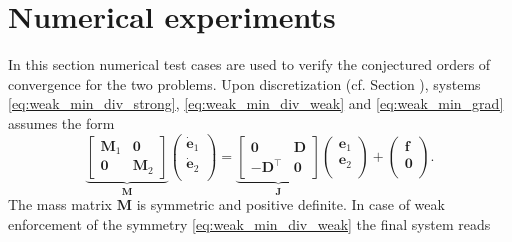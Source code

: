 \section{Numerical experiments}
\label{sec:numerics_mixed}
In this section numerical test cases are used to verify the conjectured orders of convergence for the two problems. Upon discretization (cf. Section ), systems \eqref{eq:weak_min_div_strong}, \eqref{eq:weak_min_div_weak} and \eqref{eq:weak_min_grad} assumes the form 
\begin{equation*}
\underbrace{
	\begin{bmatrix}
	\mathbf{M}_1 & \mathbf{0} \\
	\mathbf{0} & \mathbf{M}_2
	\end{bmatrix}}_{\mathbf{M}}
\begin{pmatrix}
\dot{\mathbf{e}}_1 \\
\dot{\mathbf{e}}_2 \\
\end{pmatrix} = 
\underbrace{
	\begin{bmatrix}
	\mathbf{0} & \mathbf{D} \\
	-\mathbf{D}^\top & \mathbf{0}
	\end{bmatrix}}_{\mathbf{J}}
\begin{pmatrix}
{\mathbf{e}}_1 \\
{\mathbf{e}}_2 \\
\end{pmatrix} + 
\begin{pmatrix}
\mathbf{f} \\
\mathbf{0} \\
\end{pmatrix}. 
\end{equation*}
The mass matrix $\mathbf{M}$ is symmetric and positive definite. In case of weak enforcement of the symmetry \eqref{eq:weak_min_div_weak} the final system reads
